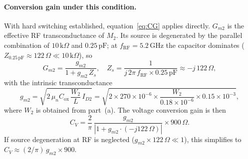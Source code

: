 \paragraph{Conversion gain under this condition.}

With hard switching established, equation~\eqref{eq:CG} applies directly.
$G_{m2}$ is the effective RF transconductance of $M_2$.  Its source is
degenerated by the parallel combination of $10\,\text{k}\Omega$ and
$0.25\,\text{pF}$; at $f_\text{RF} = 5.2\,\text{GHz}$ the capacitor dominates
($Z_{0.25\,\text{pF}} \approx 122\,\Omega \ll 10\,\text{k}\Omega$), so
\[
  G_{m2} = \frac{g_{m2}}{1 + g_{m2}\,Z_s},
  \quad Z_s = \frac{1}{j\,2\pi\,f_\text{RF}\times 0.25\,\text{pF}}
              \approx -j\,122\,\Omega,
\]
with the intrinsic transconductance
\[
  g_{m2} = \sqrt{2\,\mu_n C_\text{ox}\,\frac{W_2}{L}\,I_{D2}}
          = \sqrt{2\times270\times10^{-6}\times\frac{W_2}{0.18\times10^{-6}}
                  \times0.15\times10^{-3}},
\]
where $W_2$ is obtained from part~(a).  The voltage conversion gain is then
\[
  \boxed{C_V = \frac{2}{\pi}\,
               \frac{g_{m2}}{\left|1+g_{m2}\cdot(-j122\,\Omega)\right|}
               \times 900\,\Omega.}
\]
If source degeneration at RF is neglected ($g_{m2}\times122\,\Omega\ll1$),
this simplifies to $C_V \approx (2/\pi)\,g_{m2}\times900$.

